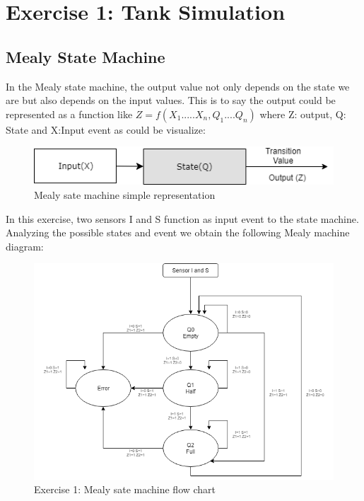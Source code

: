 



%
%
%

\section{\color{olive}Exercise 1: Tank Simulation}

\subsection{\color{purple}Mealy State Machine}

In the Mealy state machine, the output value not only depends on the state we are but also depends on the input values. This is to say the output could be represented as a function like $Z=f(X_1.....X_n,Q_1....Q_n)$ where Z: output, Q: State and X:Input event as could be visualize:

 \begin{figure}[h!]
        \centering
        \includegraphics[scale=0.75]{./Mealydiagram.png}
        \caption{\color{cyan}Mealy sate machine simple representation}
        \label{fig:ej1mealyr}
    \end{figure}

In this exercise, two sensors I and S function as input event to the state machine. Analyzing the possible states and event we obtain the following Mealy machine diagram:

 \begin{figure}[h!]
        \centering
        \includegraphics[scale=0.65]{./ej1mealy.png}
        \caption{\color{cyan}Exercise 1: Mealy sate machine flow chart}
        \label{fig:ej1mealyd}
    \end{figure}

